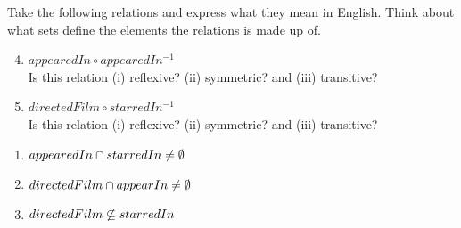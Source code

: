 \begin{questions}
Take the following relations and express what they mean in English.  Think about what sets define the elements the relations is made up of. 
\begin{enumerate}[label=(\alph*),itemsep=2pt,parsep=0pt,topsep=0pt,partopsep=0pt]
	\setcounter{enumi}{3}
	\item $appearedIn \circ appearedIn^{-1}$ \\
	Is this relation (i) reflexive? (ii) symmetric? and (iii) transitive?
	\item $directedFilm \circ starredIn^{-1}$ \\
	Is this relation (i) reflexive? (ii) symmetric? and (iii) transitive?
\end{enumerate}	
    \ifprintanswers
        \vspace{-10pt}
    \fi
    \begin{solution}
    \begin{enumerate}[label=(\alph*),itemsep=2pt,parsep=0pt,topsep=0pt,partopsep=0pt]
    	\item $appearedIn \cap starredIn \neq \emptyset $
    	\item $directedFilm \cap appearIn \neq \emptyset$ 
    	\item $directedFilm \not\subseteq starredIn $ 

\end{enumerate}
\end{solution}
\end{questions}
